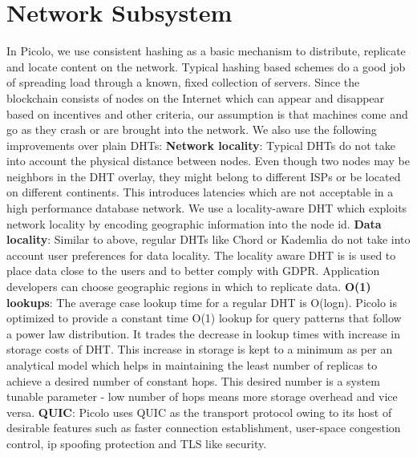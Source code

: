 \documentclass[preprint,10pt]{elsarticle}
\begin{document}
\section{Network Subsystem} 
In Picolo, we use consistent hashing as a basic mechanism to distribute, replicate and locate content on the network.
Typical hashing based schemes do a good job of spreading load through a known, fixed collection of servers. Since the
blockchain consists of nodes on the Internet which can appear and disappear based on incentives and other criteria, our
assumption is that machines come and go as they crash or are brought into the network. We also use the following improvements over plain DHTs:
\newline
\newline
\textbf{Network locality}: Typical DHTs do not take into account the physical distance between nodes. Even though two nodes may be neighbors in the DHT overlay, they might belong to different ISPs or be located on different continents. This introduces latencies which are not acceptable in a high performance database network. We use a locality-aware DHT which exploits network locality by encoding geographic information into the node id.
\newline
\newline
\textbf{Data locality}: Similar to above, regular DHTs like Chord or Kademlia do not take into account user preferences for data locality. The locality aware DHT is is used to place data close to the users and to better comply with GDPR. Application developers can choose  geographic regions in which to replicate data.
\newline
\newline
\textbf{O(1) lookups}: The average case lookup time for a regular DHT is O(logn). Picolo is optimized to provide a constant time O(1) lookup for query patterns that follow a power law distribution. It trades the decrease in lookup times with increase in storage costs of DHT. This increase in storage is kept to a minimum as per an analytical model which helps in maintaining the least number of replicas to achieve a desired number of constant hops. This desired number is a system tunable parameter - low number of hops means more storage overhead and vice versa.
\newline
\newline
\textbf{QUIC}: Picolo uses QUIC as the transport protocol owing to its host of desirable features such as faster connection establishment, user-space congestion control, ip spoofing protection and TLS like security.
\end{document}
